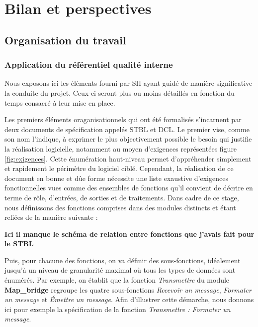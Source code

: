 \chapter{Bilan et perspectives}
\label{chap:bilan}

\section{Organisation du travail}
\label{sec:orga}
  \subsection{Application du référentiel qualité interne}
  \label{sec:qualite-interne}

  Nous exposons ici les éléments fourni par SII ayant guidé de manière significative la conduite du projet. 
  Ceux-ci seront plus ou moins détaillés en fonction du temps consacré à leur mise en place.
  
  Les premiers éléments oraganisationnels qui ont été formalisés s'incarnent par deux documents de spécification appelés \gls{STBL} et \gls{DCL}.
  Le premier vise, comme son nom l'indique, à exprimer le plus objectivement possible le besoin qui justifie la réalisation logicielle, notamment au moyen d'exigences représentées figure \ref{fig:exigences}. 
  Cette énumération haut-niveau permet d'appréhender simplement et rapidement le périmètre du logiciel ciblé. 
  Cependant, la réalisation de ce document en bonne et dûe forme nécessite une liste exaustive d'exigences fonctionnelles vues comme des ensembles de fonctions qu'il convient de décrire en terme de rôle, d'entrées, de sorties et
  de traitements. 
  Dans cadre de ce stage, nous définissons des fonctions comprises dans des modules distincts et étant reliées de la manière suivante : 
  
  \textbf{Ici il manque le schéma de relation entre fonctions que j'avais fait pour le STBL}
  
  Puis, pour chacune des fonctions, on va définir des sous-fonctions, idéalement jusqu'à un niveau de granularité maximal où tous les types de données sont énumérés. 
  Par exemple, on établit que la fonction \emph{Transmettre} du module \textbf{\textcolor{red-stbl}{Map\_bridge}} regroupe les quatre sous-fonctions \emph{Recevoir un message}, \emph{Formater un message} et \emph{\'{E}mettre un message}. 
  Afin d'illustrer cette démarche, nous donnons ici pour exemple la spécification de la fonction \emph{Transmettre : Formater un message}. 
  
